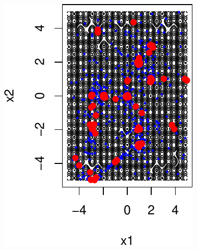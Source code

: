 \documentclass[12pt]{article}
\begin{document}
\begin{center}
{\vspace{0.7cm}
\begin{minipage}[t]{0.4\textwidth}
\includegraphics[width=\textwidth]{rastrigin_budget1000_restart10_x-crop.pdf}
\end{minipage}
}
\end{center}
\end{document}
